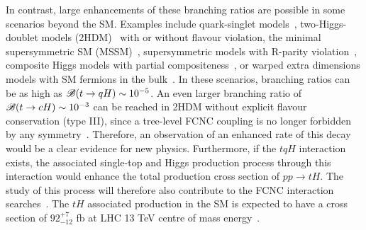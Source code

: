 In contrast, large enhancements of these branching ratios are possible in some scenarios beyond the SM.
Examples include quark-singlet models~\cite{AguilarSaavedra:2002kr}, two-Higgs-doublet models (2HDM)~\cite{Branco:2hdm2012} with or without flavour violation,
the minimal supersymmetric SM (MSSM)~\cite{Bejar:2000ub, Guasch:1999jp,Cao:2007dk,Cao:2014udj},
supersymmetric models with R-parity violation~\cite{Eilam:2001dh}, composite Higgs models with partial compositeness~\cite{Azatov:2014lha}, 
or warped extra dimensions models with SM fermions in the bulk~\cite{Azatov:2009na}. 
In these scenarios, branching ratios can be as high as $\mathscr{B}(t\to qH) \sim 10^{-5}$. 
An even larger branching ratio of  $\mathscr{B}(t\to cH) \sim 10^{-3}$ can be reached in 2HDM without explicit flavour conservation (type III),
since a tree-level FCNC coupling is no longer forbidden by any symmetry~\cite{Cheng:1987rs,Baum:2008qm,Chen:2013qta,Chiang:2015cba,Crivellin:2015hha,Botella:2015hoa, Gori:2017tvg,Chiang:2017fjr}. 
Therefore, an observation of an enhanced rate of this decay would be a clear evidence for new physics.
Furthermore, if the $tqH$ interaction exists, the associated single-top and  Higgs  production process through this interaction would enhance 
the total
production cross section of $pp\rightarrow tH$.
The study of this process will therefore also contribute to the FCNC interaction searches~\cite{Greljo:2014dka}.
The $tH$ associated production in the SM is expected to have a cross section of $92^{+7}_{-12}$ fb at LHC 13 TeV centre of mass energy~\cite{deFlorian:2016spz}.

